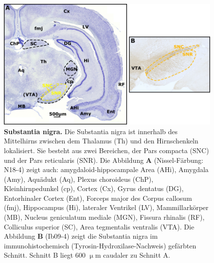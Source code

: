 \begin{figure}[H]
    \centering
    \includegraphics[width=\textwidth]{pictures/Basalganglia/SN.png}
    \caption[Substantia nigra]{\textbf{Substantia nigra.} Die Substantia nigra ist innerhalb des Mittelhirns zwischen dem Thalamus (Th) und den Hirnschenkeln lokalisiert. Sie besteht aus zwei Bereichen, der Pars compacta (SNC) und der Pars reticularis (SNR). Die Abbildung \textbf{A} (Nissel-Färbung: N18-4) zeigt auch:
    amygdaloid-hippocampale Area (AHi), Amygdala (Amy), Aquädukt (Aq), Plexus choroideus (ChP), Kleinhirnpedunkel (cp), Cortex (Cx), Gyrus dentatus (DG), Entorhinaler Cortex (Ent), Forceps major des Corpus callosum (fmj), Hippocampus (Hi), lateraler Ventrikel (LV), Mammillarkörper (MB), Nucleus geniculatum mediale (MGN), Fissura rhinalis (RF), Colliculus superior (SC), Area tegmentalis ventralis (VTA). Die Abbildung \textbf{B} (Ib09-4) zeigt die Substantia nigra im immunohistochemisch (Tyrosin-Hydroxilase-Nachweis) gefärbten Schnitt. Schnitt B liegt 600 $\upmu$m caudaler zu Schnitt A.}
    \label{fig:SN_Basalganglia}
\end{figure}

